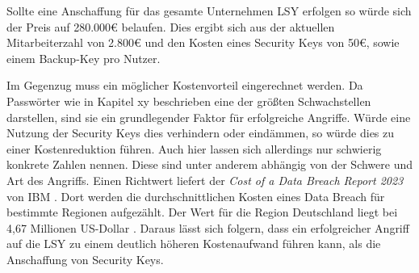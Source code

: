 Sollte eine Anschaffung für das gesamte Unternehmen \ac{LSY} erfolgen so würde sich der Preis auf 280.000€ belaufen. Dies ergibt sich aus der aktuellen Mitarbeiterzahl von 2.800€ und den Kosten eines Security Keys von 50€, sowie einem Backup-Key pro Nutzer.

Im Gegenzug muss ein möglicher Kostenvorteil eingerechnet werden. Da Passwörter wie in Kapitel xy beschrieben eine der größten Schwachstellen darstellen, sind sie ein grundlegender Faktor für erfolgreiche Angriffe. Würde eine Nutzung der Security Keys dies verhindern oder eindämmen, so würde dies zu einer Kostenreduktion führen. Auch hier lassen sich allerdings nur schwierig konkrete Zahlen nennen. Diese sind unter anderem abhängig von der Schwere und Art des Angriffs. Einen Richtwert liefert der \textit{Cost of a Data Breach Report 2023} von IBM \cite{databreach}. Dort werden die durchschnittlichen Kosten eines Data Breach für bestimmte Regionen aufgezählt. Der Wert für die Region Deutschland liegt bei 4,67 Millionen US-Dollar \cite{databreach}. Daraus lässt sich folgern, dass ein erfolgreicher Angriff auf die \ac{LSY} zu einem deutlich höheren Kostenaufwand führen kann, als die Anschaffung von Security Keys.
